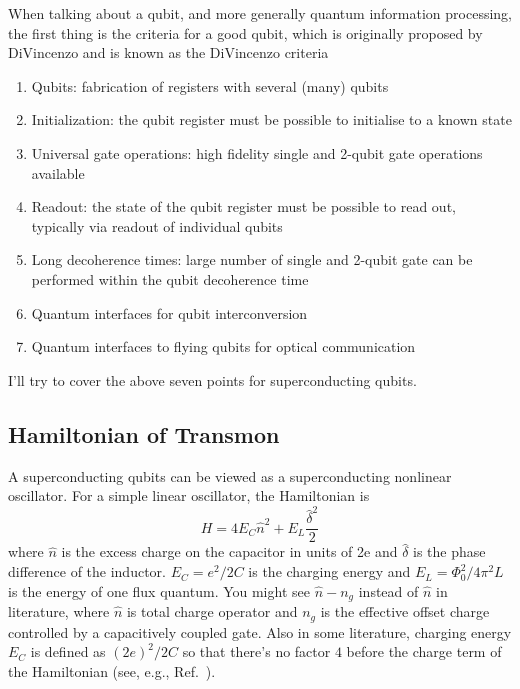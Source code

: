 \documentclass[%
groupedaddress,
showpacs,
 amsmath,amssymb,
 aps,
prb,
]{revtex4-1}
\begin{document}
    When talking about a qubit, and more generally quantum information processing, the first thing is the criteria for a good qubit, which is originally proposed by DiVincenzo\cite{divincenzo2000physical} and is known as the DiVincenzo criteria
    \begin{enumerate}
        \item Qubits: fabrication of registers with several (many) qubits
        \item Initialization: the qubit register must be possible to initialise to a known state
        \item Universal gate operations: high fidelity single and 2-qubit gate operations available
        \item Readout: the state of the qubit register must be possible to read out, typically via readout of individual qubits
        \item Long decoherence times: large number of single and 2-qubit gate can be performed within the qubit decoherence time
        \item Quantum interfaces for qubit interconversion
        \item Quantum interfaces to flying qubits for optical communication
    \end{enumerate}
    I'll try to cover the above seven points for superconducting qubits.


    \subsection{Hamiltonian of Transmon} %
    \label{sub:hamiltonian_of_transmon}
    A superconducting qubits can be viewed as a superconducting nonlinear oscillator. For a simple linear oscillator, the Hamiltonian is
    \begin{equation}
    \label{eqn:linearOscillatorHam}
        H = 4E_C \hat n^2 + E_L \frac{\hat \delta^2}{2}
    \end{equation}
    where $\hat n$ is the excess charge on the capacitor in units of 2e and $ \hat \delta  $ is the phase difference of the inductor. $E_C = e^2/2C$ is the charging energy\cite{koch2007charge} and $E_L = \Phi_0^2/4 \pi^2 L $ is the energy of one flux quantum. You might see $\hat n - n_g$ instead of $\hat n$ in literature, where $\hat n$ is total charge operator and $n_g$ is the effective offset charge controlled by a capacitively coupled gate. Also in some literature, charging energy $E_C$ is defined as $ (2e)^2/2C $ so that there's no factor $4$ before the charge term of the Hamiltonian (see, e.g., Ref.~).
\end{document}
